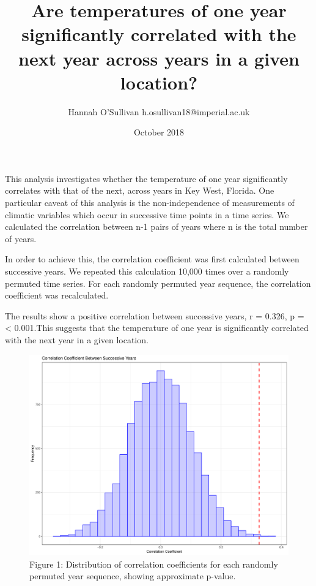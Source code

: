 \documentclass[12pt]{article}
\title{Are temperatures of one year significantly correlated with the next year across years in a given location?}
\author{Hannah O'Sullivan h.osullivan18@imperial.ac.uk}
\date{October 2018}
\begin{document}
  \maketitle
  This analysis investigates whether the temperature of one year significantly correlates with that of the next, across years in Key West, Florida. One particular caveat of this analysis is the non-independence of measurements of climatic variables which occur in successive time points in a time series. We calculated the correlation between n-1 pairs of years where n is the total number of years.

  In order to achieve this, the correlation coefficient was first calculated between successive years. We repeated this calculation 10,000 times over a randomly permuted time series. For each randomly permuted year sequence, the correlation coefficient was recalculated.

  The results show a positive correlation between successive years, r = 0.326, p = < 0.001.This suggests that the temperature of one year is significantly correlated with the next year in a given location.

\begin{figure}[ft]
      \includegraphics[width = 1\textwidth]{../Data/TAutoCorrPlot.PDF}
      \caption{Figure 1: Distribution of correlation coefficients for each randomly permuted year sequence, showing approximate p-value.}
\end{figure}
\end{document}
